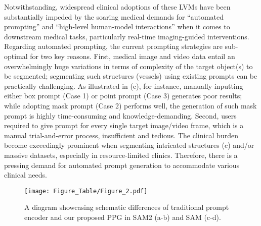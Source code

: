 Notwithstanding, widespread clinical adoptions of these LVMs have been substantially impeded by the soaring medical demands for ``automated prompting'' and ``high-level human-model interactions'' when it comes to downstream medical tasks, particularly real-time imaging-guided interventions. Regarding automated prompting, the current prompting strategies are sub-optimal for two key reasons. First, medical image and video data entail an overwhelmingly huge variations in terms of complexity of the target object(s) to be segmented; segmenting such structures (\eg vessels) using existing prompts can be practically challenging. As illustrated in (c), for instance, manually inputting either box prompt (Case 1) or point prompt (Case 3) generates poor results; while adopting mask prompt (Case 2) performs well, the generation of such mask prompt is highly time-consuming and knowledge-demanding. Second, users required to give prompt for every single target image/video frame, which is a manual trial-and-error process, insufficient and tedious. The clinical burden  become exceedingly prominent when segmenting intricated structures (c) and/or massive datasets, especially in resource-limited clinics. Therefore, there is a pressing demand for automated prompt generation to accommodate various clinical needs.

\begin{figure}
  \centering
  \setlength{\abovecaptionskip}{3pt}
   \texttt{[image: Figure\_Table/Figure\_2.pdf]}
   \caption{A diagram showcasing schematic differences of traditional prompt encoder and our proposed PPG in SAM2 (a-b) and SAM (c-d).}
   \label{fig:Figure2}
   \vspace{-15pt}
\end{figure}

